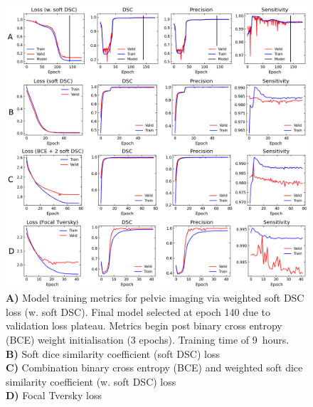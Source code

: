 \begin{figure}[H]
	\begin{center}
		\hspace*{-1.2cm}\includegraphics[width=1.15\textwidth]{figures/prostate_metrics_all}
		\caption{\textbf{A)} Model training metrics for pelvic imaging via weighted
      soft DSC loss (w. soft DSC). Final model selected at epoch 140 due to
      validation loss plateau. Metrics begin post binary cross entropy (BCE)
      weight initialisation (3 epochs). Training time of 9~hours. \\
		\textbf{B)} Soft dice similarity coefficient (soft DSC) loss \\
		\textbf{C)} Combination binary cross entropy (BCE) and weighted soft dice
    similarity coefficient (w. soft DSC) loss\\
		\textbf{D)} Focal Tversky loss}
		\label{fig:prostate_metrics}
	\end{center}
\end{figure}


